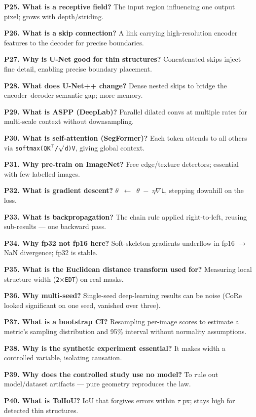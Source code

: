 \documentclass[11pt]{article}
\begin{document}
\textbf{P25. What is a receptive field?} The input region influencing one output pixel; grows with depth/striding.

\textbf{P26. What is a skip connection?} A link carrying high-resolution encoder features to the decoder for precise boundaries.

\textbf{P27. Why is U-Net good for thin structures?} Concatenated skips inject fine detail, enabling precise boundary placement.

\textbf{P28. What does U-Net++ change?} Dense nested skips to bridge the encoder--decoder semantic gap; more memory.

\textbf{P29. What is ASPP (DeepLab)?} Parallel dilated convs at multiple rates for multi-scale context without downsampling.

\textbf{P30. What is self-attention (SegFormer)?} Each token attends to all others via \texttt{softmax(QK$^{\top}$/$\surd$d)V}, giving global context.

\textbf{P31. Why pre-train on ImageNet?} Free edge/texture detectors; essential with few labelled images.

\textbf{P32. What is gradient descent?} \texttt{$\theta$ $\leftarrow$ $\theta$ $-$ $\eta$$\nabla$L}, stepping downhill on the loss.

\textbf{P33. What is backpropagation?} The chain rule applied right-to-left, reusing sub-results --- one backward pass.

\textbf{P34. Why fp32 not fp16 here?} Soft-skeleton gradients underflow in fp16 $\rightarrow$ NaN divergence; fp32 is stable.

\textbf{P35. What is the Euclidean distance transform used for?} Measuring local structure width (\texttt{2$\times$EDT}) on real masks.

\textbf{P36. Why multi-seed?} Single-seed deep-learning results can be noise (CoRe looked significant on one seed, vanished over three).

\textbf{P37. What is a bootstrap CI?} Resampling per-image scores to estimate a metric's sampling distribution and 95\% interval without normality assumptions.

\textbf{P38. Why is the synthetic experiment essential?} It makes width a controlled variable, isolating causation.

\textbf{P39. Why does the controlled study use no model?} To rule out model/dataset artifacts --- pure geometry reproduces the law.

\textbf{P40. What is TolIoU?} IoU that forgives errors within \texttt{$\tau$} px; stays high for detected thin structures.
\end{document}
